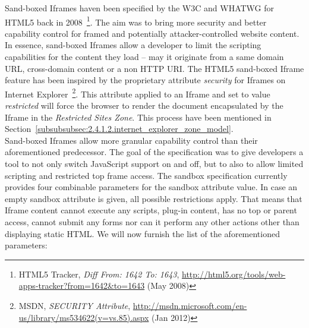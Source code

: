     Sand-boxed Iframes haven been specified by the W3C and WHATWG for HTML5 back in 2008~\footnote{HTML5 Tracker, \textit{Diff From: 1642 To: 1643}, \url{http://html5.org/tools/web-apps-tracker?from=1642&to=1643} (May 2008)}. The aim was to bring more security and better capability control for framed and potentially attacker-controlled website content. In essence, sand-boxed Iframes allow a developer to limit the scripting capabilities for the content they load -- may it originate from a same domain URL, cross-domain content or a non HTTP URI. The HTML5 sand-boxed Iframe feature has been inspired by the proprietary attribute \textit{security} for Iframes on Internet Explorer~\footnote{MSDN, \textit{SECURITY Attribute}, \url{http://msdn.microsoft.com/en-us/library/ms534622(v=vs.85).aspx} (Jan 2012)}. This attribute applied to an Iframe and set to value \textit{restricted} will force the browser to render the document encapsulated by the Iframe in the \textit{Restricted Sites Zone}. This process have been 
mentioned in Section~\ref{subsubsubsec:2.4.1.2.internet_explorer_zone_model}.\\

    Sand-boxed Iframes allow more granular capability control than their aforementioned predecessor. The goal of the specification was to give developers a tool to not only switch JavaScript support on and off, but to also to allow limited scripting and restricted top frame access. The sandbox specification currently provides four combinable parameters for the sandbox attribute value. In case an empty sandbox attribute is given, all possible restrictions apply. That means that Iframe content cannot execute any scripts, plug-in content, has no top or parent access, cannot submit any forms nor can it perform any other actions other than displaying static HTML. We will now furnish the list of the aforementioned parameters:

